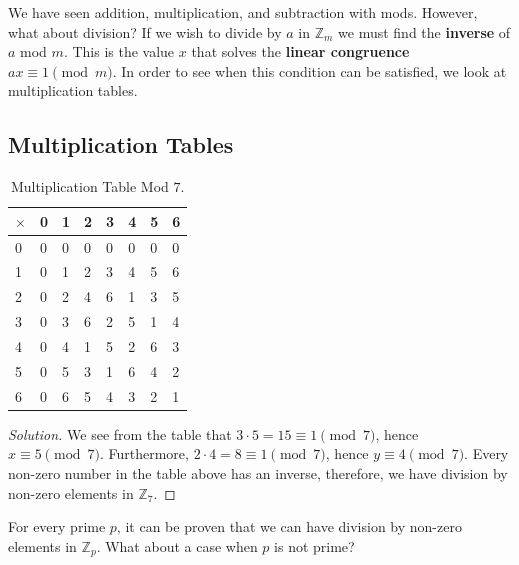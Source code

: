 We have seen addition, multiplication, and subtraction with mods. However, what about division? If we wish to divide by $a$ in $\mathbb{Z}_{m}$ we must find the \textbf{inverse} of $a$ mod $m$. This is the value $x$ that solves the \textbf{linear congruence} $ax\equiv 1\pmod{m}$. In order to see when this condition can be satisfied, we look at multiplication tables. 
\clearpage 
\subsection{Multiplication Tables}

	\begin{table}[H]
	\centering
	\begin{tabular}{l | l l l l l l l}
		\toprule
		$\times$ & 0 & 1 & 2 & 3 & 4 & 5 & 6\\
		\midrule
		0 & 0 & 0 & 0 & 0 & 0 & 0 & 0 \\
		1 & 0 & 1 & 2 & 3 & 4 & 5 & 6\\ 
		2 & 0 & 2 & 4 & 6 & 1 & 3 & 5\\
		3 & 0 & 3 & 6 & 2 & 5 & 1 & 4\\
		4 & 0 & 4 & 1 & 5 & 2 & 6 & 3\\
		5 & 0 & 5 & 3 & 1 & 6 & 4 & 2 \\
		6 & 0 & 6 & 5 & 4 & 3 & 2 & 1 \\
		\bottomrule
	\end{tabular}
	\caption{Multiplication Table Mod $7$.}
\end{table}

\begin{proof}[Solution] We see from the table that $3\cdot 5=15\equiv 1\pmod{7}$, hence $x\equiv 5\pmod{7}$. Furthermore, $2\cdot 4=8\equiv 1\pmod{7}$, hence $y\equiv 4\pmod{7}$. Every non-zero number in the table above has an inverse, therefore, we have division by non-zero elements in $\mathbb{Z}_7$. \end{proof}

For every prime $p$, it can be proven that we can have division by non-zero elements in $\mathbb{Z}_p$. What about a case when $p$ is not prime?

